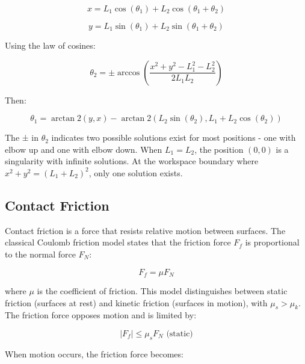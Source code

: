     \begin{equation}
    x = L_1 \cos(\theta_1) + L_2 \cos(\theta_1 + \theta_2)
    \end{equation}
    
    \begin{equation}
    y = L_1 \sin(\theta_1) + L_2 \sin(\theta_1 + \theta_2)
    \end{equation}
    
    Using the law of cosines:
    
    \begin{equation}
    \theta_2 = \pm \arccos\left(\frac{x^2 + y^2 - L_1^2 - L_2^2}{2L_1L_2}\right)
    \end{equation}
    
    Then:
    
    \begin{equation}
    \theta_1 = \arctan2(y,x) - \arctan2(L_2\sin(\theta_2), L_1 + L_2\cos(\theta_2))
    \end{equation}
    
    The ± in \(\theta_2\) indicates two possible solutions exist for most positions - one with elbow up and one with elbow down. When \(L_1 = L_2\), the position \((0,0)\) is a singularity with infinite solutions. At the workspace boundary where \(x^2 + y^2 = (L_1 + L_2)^2\), only one solution exists.

\subsection{Contact Friction}
\label{sec:contact_friction}
Contact friction is a force that resists relative motion between surfaces. The classical Coulomb friction model \cite{modern_robotics_book} states that the friction force \(F_f\) is proportional to the normal force \(F_N\):

\begin{equation}
\label{eq:coulomb_friction}
F_f = \mu F_N
\end{equation}

where \(\mu\) is the coefficient of friction. This model distinguishes between static friction (surfaces at rest) and kinetic friction (surfaces in motion), with \(\mu_s > \mu_k\). The friction force opposes motion and is limited by:

\begin{equation}
\label{eq:friction_inequality}
|F_f| \leq \mu_s F_N \text{ (static)}
\end{equation}

When motion occurs, the friction force becomes:

